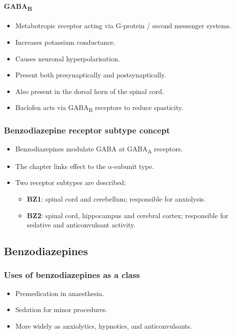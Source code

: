 \documentclass[11pt,a4paper]{article}
\begin{document}
\paragraph{GABA\textsubscript{B}}
\begin{itemize}
  \item Metabotropic receptor acting via G-protein / second messenger systems.
  \item Increases potassium conductance.
  \item Causes neuronal hyperpolarisation.
  \item Present both presynaptically and postsynaptically.
  \item Also present in the dorsal horn of the spinal cord.
  \item Baclofen acts via GABA\textsubscript{B} receptors to reduce spasticity.
\end{itemize}

\subsubsection{Benzodiazepine receptor subtype concept}
\begin{itemize}
  \item Benzodiazepines modulate GABA at GABA\textsubscript{A} receptors.
  \item The chapter links effect to the $\alpha$-subunit type.
  \item Two receptor subtypes are described:
  \begin{itemize}
    \item \textbf{BZ1}: spinal cord and cerebellum; responsible for anxiolysis.
    \item \textbf{BZ2}: spinal cord, hippocampus and cerebral cortex; responsible for sedative and anticonvulsant activity.
  \end{itemize}
\end{itemize}

\subsection{Benzodiazepines}

\subsubsection{Uses of benzodiazepines as a class}
\begin{itemize}
  \item Premedication in anaesthesia.
  \item Sedation for minor procedures.
  \item More widely as anxiolytics, hypnotics, and anticonvulsants.
\end{itemize}
\end{document}
